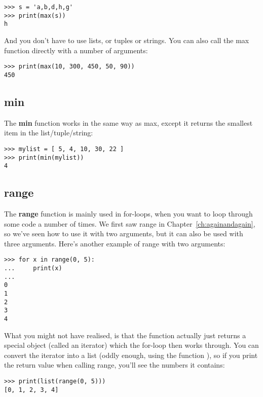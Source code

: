 \begin{Verbatim}[frame=single]
>>> s = 'a,b,d,h,g'
>>> print(max(s))
h
\end{Verbatim}

\noindent
And you don't have to use lists, or tuples or strings. You can also call the max function directly with a number of arguments:

\begin{Verbatim}[frame=single]
>>> print(max(10, 300, 450, 50, 90))
450
\end{Verbatim}

\subsection*{min}

The \textbf{min} function works in the same way as max, except it returns the smallest item in the list/tuple/string:

\begin{Verbatim}[frame=single]
>>> mylist = [ 5, 4, 10, 30, 22 ]
>>> print(min(mylist))
4
\end{Verbatim}

\subsection*{range}

The \textbf{range} function is mainly used in for-loops, when you want to loop through some code a number of times. We first saw range in Chapter~\ref{ch:againandagain}, so we've seen how to use it with two arguments, but it can also be used with three arguments. Here's another example of range with two arguments:

\begin{Verbatim}[frame=single]
>>> for x in range(0, 5):
...     print(x)
...
0
1
2
3
4
\end{Verbatim}

\noindent
What you might not have realised, is that the  function actually just returns a special object (called an iterator) which the for-loop then works through. You can convert the iterator into a list (oddly enough, using the function ), so if you print the return value when calling range, you'll see the numbers it contains:

\begin{Verbatim}[frame=single]
>>> print(list(range(0, 5)))
[0, 1, 2, 3, 4]
\end{Verbatim}


